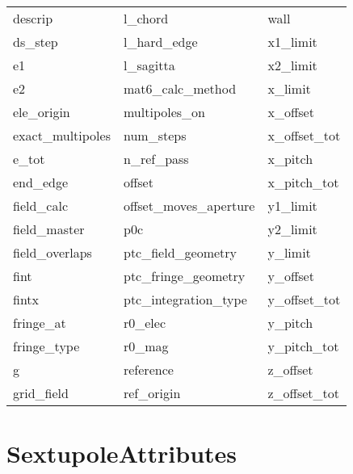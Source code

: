 \begin{tabular}{lll}
descrip                     & l_chord                     & wall                        \\
ds_step                     & l_hard_edge                 & x1_limit                    \\
e1                          & l_sagitta                   & x2_limit                    \\
e2                          & mat6_calc_method            & x_limit                     \\
ele_origin                  & multipoles_on               & x_offset                    \\
exact_multipoles            & num_steps                   & x_offset_tot                \\
e_tot                       & n_ref_pass                  & x_pitch                     \\
end_edge                    & offset                      & x_pitch_tot                 \\
field_calc                  & offset_moves_aperture       & y1_limit                    \\
field_master                & p0c                         & y2_limit                    \\
field_overlaps              & ptc_field_geometry          & y_limit                     \\
fint                        & ptc_fringe_geometry         & y_offset                    \\
fintx                       & ptc_integration_type        & y_offset_tot                \\
fringe_at                   & r0_elec                     & y_pitch                     \\
fringe_type                 & r0_mag                      & y_pitch_tot                 \\
g                           & reference                   & z_offset                    \\
grid_field                  & ref_origin                  & z_offset_tot                \\
 \bottomrule
 \end{tabular}
 \vfill
 
 \section{SextupoleAttributes}
 \label{s:list.sextupole}
 
